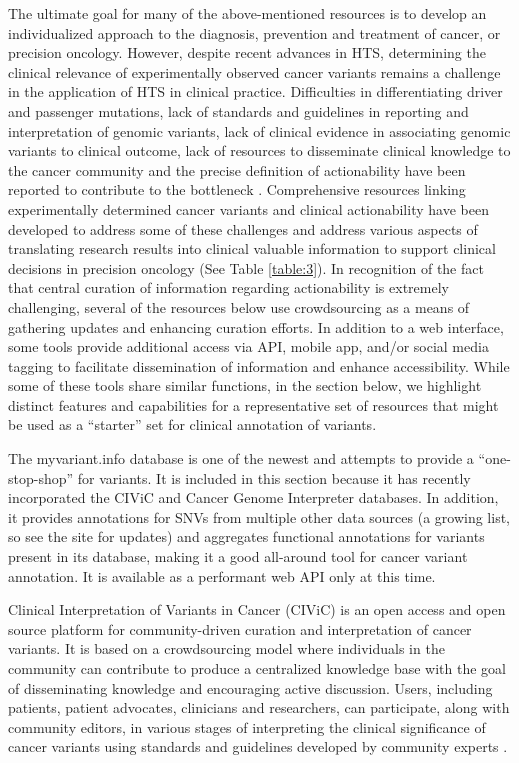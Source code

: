 \documentclass{article}
\begin{document}
The ultimate goal for many of the above-mentioned resources is to
develop an individualized approach to the diagnosis, prevention and
treatment of cancer, or precision oncology. However, despite recent
advances in HTS, determining the clinical relevance of experimentally
observed cancer variants remains a challenge in the application of HTS
in clinical practice. Difficulties in differentiating driver and
passenger mutations, lack of standards and guidelines in reporting and
interpretation of genomic variants, lack of clinical evidence in
associating genomic variants to clinical outcome, lack of resources to
disseminate clinical knowledge to the cancer community and the precise
definition of actionability have been reported to contribute to the
bottleneck
\parencite{Li2017-aw,Prawira2017-gv,Uzilov2016-ct,Hedley_Carr2016-ul}. Comprehensive
resources linking experimentally determined cancer variants and
clinical actionability have been developed to address some of these
challenges and address various aspects of translating research results
into clinical valuable information to support clinical decisions in
precision oncology (See Table \ref{table:3}). In recognition of the fact that
central curation of information regarding actionability is extremely
challenging, several of the resources below use crowdsourcing as a
means of gathering updates and enhancing curation efforts. In addition
to a web interface, some tools provide additional access via API,
mobile app, and/or social media tagging to facilitate dissemination of
information and enhance accessibility. While some of these tools share
similar functions, in the section below, we highlight distinct
features and capabilities for a representative set of resources that
might be used as a ``starter'' set for clinical annotation of
variants.

The myvariant.info database is one of the newest and attempts to
provide a ``one-stop-shop'' for variants. It is included in this
section because it has recently incorporated the CIViC and Cancer
Genome Interpreter databases. In addition, it provides annotations for
SNVs from multiple other data sources (a growing list, so see the site
for updates) and aggregates functional annotations for variants
present in its database, making it a good all-around tool for cancer
variant annotation. It is available as a performant web API only at
this time. 

Clinical Interpretation of Variants in Cancer (CIViC) is an open
access and open source platform for community-driven curation and
interpretation of cancer variants. It is based on a crowdsourcing
model where individuals in the community can contribute to produce a
centralized knowledge base with the goal of disseminating knowledge
and encouraging active discussion. Users, including patients, patient
advocates, clinicians and researchers, can participate, along with
community editors, in various stages of interpreting the clinical
significance of cancer variants using standards and guidelines
developed by community experts \parencite{Li2017-aw,Griffith2016-sy}.
\end{document}
